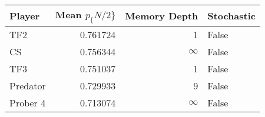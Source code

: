 \begin{tabular}{lrrl}
\toprule
   Player &  Mean $p_\{N/2\}$ &  Memory Depth & Stochastic \\
\midrule
      TF2 &        0.761724 &             1 &      False \\
       CS &        0.756344 &            \(\infty\) &      False \\
      TF3 &        0.751037 &             1 &      False \\
 Predator &        0.729933 &             9 &      False \\
 Prober 4 &        0.713074 &            \(\infty\) &      False \\
\bottomrule
\end{tabular}
